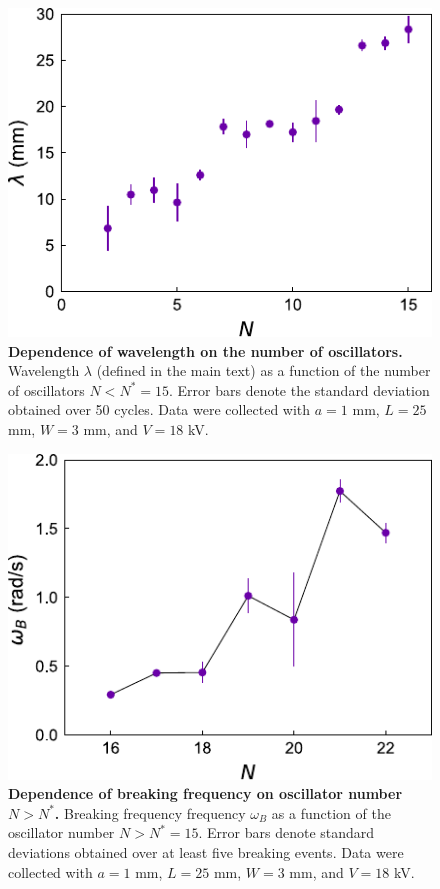 \begin{appendices}
\begin{figure}[p]
    \centering
    \includegraphics{figures/A2_SI2.pdf}
    \caption{\textbf{Dependence of wavelength on the number of oscillators.} Wavelength $\lambda$ (defined in the main text) as a function of the number of oscillators $N<N^*=15$. Error bars denote the standard deviation obtained over 50 cycles.  Data  were collected with $a=1$ mm, $L=25$ mm, $W=3$ mm, and $V=18$ kV.}
    \label{fig:SI2}
\end{figure}

\begin{figure}[p]
    \centering
    \includegraphics{figures/A2_SI3.pdf}
    \caption{\textbf{Dependence of breaking frequency on  oscillator number $N>N^*$.} Breaking frequency frequency $\omega_B$ as a function of the oscillator number $N>N^*=15$. Error bars denote standard deviations obtained over at least five breaking events. Data  were collected with $a=1$ mm, $L=25$ mm, $W=3$ mm, and $V=18$ kV.}
    \label{fig:SI3}
\end{figure}



\end{appendices}
